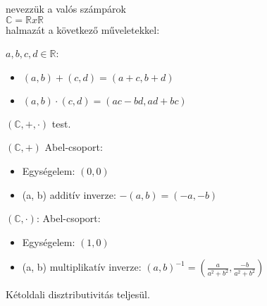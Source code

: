 \begin{frame}
\begin{tcolorbox}[title={Def.: Komplex számok}]
   nevezzük a valós számpárok\\
  $\mathbb{C} = \mathbb{R} x \mathbb{R}$\\
  halmazát a következő műveletekkel:\\
  \msmallskip

  $a, b, c, d \in \mathbb{R}$:\\
  \begin{itemize}
    \item $(a, b) + (c, d) = (a + c, b + d)$\\
    \item $(a, b) \cdot (c, d) = (ac - bd, ad + bc)$
  \end{itemize}
\end{tcolorbox}

\begin{tcolorbox}[title={Ész}]
  $(\mathbb{C}, +, {\cdot})$ test.\\
  \mmedskip

  $(\mathbb{C}, +)$ Abel-csoport:\\
  \begin{itemize}
    \item Egységelem: $(0, 0)$
    \item (a, b) additív inverze: $-(a, b) = (-a, -b)$
  \end{itemize}
  \mmedskip

  $(\mathbb{C}, {\cdot})$: Abel-csoport:\\
  \begin{itemize}
    \item Egységelem: $(1, 0)$
    \item (a, b) multiplikatív inverze: $(a, b)^{-1} = (\frac{a}{a^2 + b^2}, \frac{-b}{a^2 + b^2})$
  \end{itemize}
  \mmedskip

  Kétoldali disztributivitás teljesül.
\end{tcolorbox}
\end{frame}

